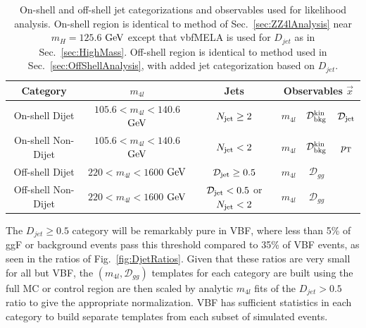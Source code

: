 \begin{table}[htb]
\begin{center}
\begin{tabular}{cccccc}
\hline
Category & $m_{4l}$ & Jets & \multicolumn{3}{c}{Observables $\vec{x}$} \\
\hline
\hline
On-shell Dijet & $105.6<m_{4l}<140.6$ $\rm{GeV}$ & $N_{\rm jet}\ge2$ & $m_{4l}$ & ${\mathcal D}^{\rm kin}_{\rm bkg}$ & ${\mathcal{D}}_{\rm jet}$ \\
On-shell Non-Dijet & $105.6<m_{4l}<140.6$ $\rm{GeV}$ & $N_{\rm jet}<2$ & $m_{4l}$ & ${\mathcal D}^{\rm kin}_{\rm bkg}$ & ${p}_{\rm T}$ \\
Off-shell Dijet & $220<m_{4l}<1600$ $\rm{GeV}$ & ${\mathcal{D}}_{\rm jet}\geq0.5$ & $m_{4l}$ & $\mathcal{D}_{gg}$ &  \\
Off-shell Non-Dijet & $220<m_{4l}<1600$ $\rm{GeV}$ & ${\mathcal{D}}_{\rm jet}<0.5$ or $N_{\rm jet}<2$ & $m_{4l}$ & $\mathcal{D}_{gg}$ &  \\
\hline
\end{tabular}
\caption[Categorizations and Observables Used in On-shell and Off-shell Regions of $f_{\Lambda Q}$ Measurement]{On-shell and off-shell jet categorizations and observables used for likelihood analysis. On-shell region is identical to method of Sec.~\ref{sec:ZZ4lAnalysis} near $m_{H}=125.6$ $\rm{GeV}$ except that vbfMELA is used for $D_{jet}$ as in Sec.~\ref{sec:HighMass}. Off-shell region is identical to method used in Sec.~\ref{sec:OffShellAnalysis}, with added jet categorization based on $D_{jet}$.}
\label{tbl:OffShellCatsAndObervs}
\end{center}
\end{table}

The $D_{jet}\geq0.5$ category will be remarkably pure in VBF, where less than 5\% of ggF or background events pass this threshold compared to 35\% of VBF events, as seen in the ratios of Fig.~\ref{fig:DjetRatios}. Given that these ratios are very small for all but VBF, the $(m_{4l},\mathcal{D}_{gg})$ templates for each category are built using the full MC or control region are then scaled by analytic $m_{4l}$ fits of the $D_{jet}>0.5$ ratio to give the appropriate normalization. VBF has sufficient statistics in each category to build separate templates from each subset of simulated events.


